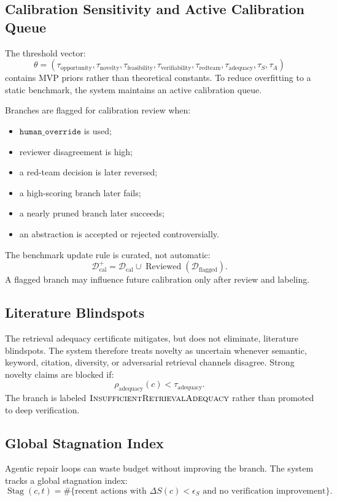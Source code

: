 \documentclass[11pt]{article}
\begin{document}
\subsection{Calibration Sensitivity and Active Calibration Queue}
The threshold vector:
$$
\theta=(\tau_{\text{opportunity}},\tau_{\text{novelty}},\tau_{\text{feasibility}},\tau_{\text{verifiability}},\tau_{\text{redteam}},\tau_{\text{adequacy}},\tau_S,\tau_A)
$$
contains MVP priors rather than theoretical constants. To reduce overfitting to a static benchmark, the system maintains an active calibration queue.

Branches are flagged for calibration review when:
\begin{itemize}[leftmargin=*]
    \item $\texttt{human\_override}$ is used;
    \item reviewer disagreement is high;
    \item a red-team decision is later reversed;
    \item a high-scoring branch later fails;
    \item a nearly pruned branch later succeeds;
    \item an abstraction is accepted or rejected controversially.
\end{itemize}

The benchmark update rule is curated, not automatic:
$$
\mathcal{D}_{\text{cal}}^{+}
=
\mathcal{D}_{\text{cal}}
\cup
\operatorname{Reviewed}(\mathcal{D}_{\text{flagged}}).
$$
A flagged branch may influence future calibration only after review and labeling.

\subsection{Literature Blindspots}
The retrieval adequacy certificate mitigates, but does not eliminate, literature blindspots. The system therefore treats novelty as uncertain whenever semantic, keyword, citation, diversity, or adversarial retrieval channels disagree. Strong novelty claims are blocked if:
$$
\rho_{\text{adequacy}}(c)<\tau_{\text{adequacy}}.
$$
The branch is labeled $\textsc{InsufficientRetrievalAdequacy}$ rather than promoted to deep verification.

\subsection{Global Stagnation Index}
Agentic repair loops can waste budget without improving the branch. The system tracks a global stagnation index:
$$
\operatorname{Stag}(c,t)
=
\#\{\text{recent actions with }\Delta S(c)<\epsilon_S
\text{ and no verification improvement}\}.
$$
\end{document}
